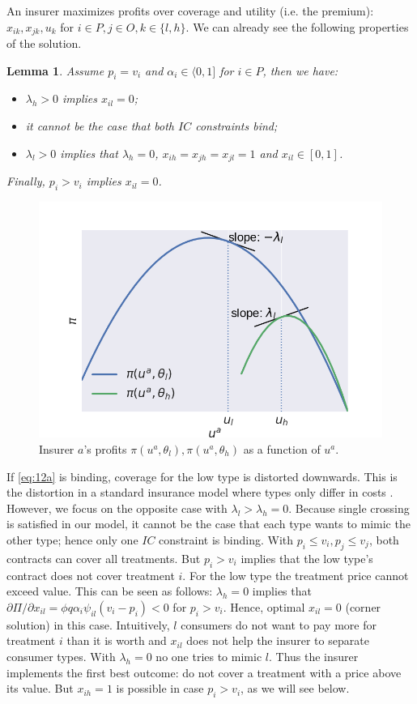 \documentclass[a4paper,12pt]{article}
\newtheorem{lemma}{Lemma}
\begin{document}
An insurer maximizes profits over coverage and utility (i.e. the premium): \(x_{ik},x_{jk},u_k\) for \(i \in P, j \in O, k \in \{l,h\}\). We can already see the following properties of the solution.
\begin{lemma}
\label{Baseline_results}
Assume \(p_i = v_i\) and \(\alpha_i \in \langle 0,1]\) for \(i \in P\), then we have:
\begin{itemize}
\item \(\lambda_h>0\) implies \(x_{il}=0\);
\item it cannot be the case that both \(IC\) constraints bind;
\item \(\lambda_{l}>0\) implies that \(\lambda_h=0\), \(x_{ih}=x_{jh}=x_{jl}=1\) and \(x_{il} \in [0,1]\).
\end{itemize}
Finally, \(p_i >v_i\) implies \(x_{il} =0\).
\end{lemma}

\begin{figure}[htbp]
\centering
\includegraphics[width=.9\linewidth]{profitfunctions.png}
\caption{\label{fig:profitfunctions}Insurer \(a\)'s profits \(\pi(u^a,\theta_l),\pi(u^a,\theta_h)\) as a function of \(u^a\).}
\end{figure}

If \eqref{eq:12a} is binding, coverage for the low type is distorted downwards. This is the distortion in a standard insurance model where types only differ in costs \citep{rot76}. However, we focus on the opposite case with \(\lambda_l > \lambda_h = 0\). Because single crossing is satisfied in our model, it cannot be the case that each type wants to mimic the other type; hence only one \(IC\) constraint is binding. With \(p_i \leq v_i, p_j \leq v_j\), both contracts can cover all treatments. But \(p_i > v_i\) implies that the low type's contract does not cover treatment \(i\). For the low type the treatment price cannot exceed value. This can be seen as follows: \(\lambda_h =0\) implies that \(\partial \Pi/\partial x_{il}=\phi q \alpha_i \psi_{il} (v_i-p_i) < 0\) for \(p_i > v_i\). Hence, optimal \(x_{il}=0\) (corner solution) in this case. Intuitively, \(l\) consumers do not want to pay more for treatment \(i\) than it is worth and \(x_{il}\) does not help the insurer to separate consumer types. With \(\lambda_h = 0\) no one tries to mimic \(l\). Thus the insurer implements the first best outcome: do not cover a treatment with a price above its value. But \(x_{ih}=1\) is possible in case \(p_i > v_i\), as we will see below.
\end{document}
